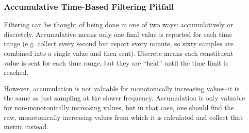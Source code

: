 \subsubsection{Accumulative Time-Based Filtering Pitfall}

Filtering can be thought of being done in one of two ways: accumulatively or discretely. Accumulative means only one
final value is reported for each time range (e.g. collect every second but report every minute, so sixty samples are
combined into a single value and then sent). Discrete means each constituent value is sent for each time range, but they
are ``held'' until the time limit is reached.

However, accumulation is not valuable for monotonically increasing values--it is the same as just sampling at the slower
frequency. Accumulation is only valuable for non-monotonically increasing values, but in that case, one should find the
raw, monotonically increasing values from which it is calculated and collect that metric instead.

